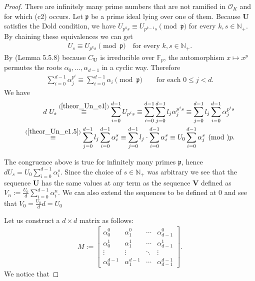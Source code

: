 \documentclass[preprint,12pt]{elsarticle}
\newcommand{\N}{\mathbb{N}}
\newcommand{\F}{\mathbb{F}}
\newcommand{\OO}{\mathcal{O}}
\newcommand{\alphas}{\alpha_0,\ldots,\alpha_{d-1}}
\newcommand{\pp}{\mathfrak{p} }
\begin{document}
\begin{proof}

    There are infinitely many prime numbers that are not ramified in $\OO_K$ and for which (c2) occurs. Let  $\pp$  be a prime ideal lying over one of them.
    Because ${\mathbf U}$ satisfies the Dold condition, we have $ U_{p^ks} \equiv  U_{p^{k-1}s} \pmod \pp$ for every $k,s\in\N_+$. By chaining these equivalences we can get
    \begin{align}\label{theor_Un_e1}
         U_{s} \equiv  U_{p^{k}s} \pmod \pp \quad\text{for every $k,s\in\N_+$}.
    \end{align}
    By \cite{frob} (Lemma 5.5.8) because $C_\mathbf{U}$ is irreducible over $\F_p$, the automorphism $x \mapsto x^p$ permutes the roots $\alphas$ in a cyclic way. Therefore 
    \begin{align}\label{theor_Un_e1.5}
        \sum_{i=0}^{d-1}\alpha_j^{p^i} \equiv \sum_{i=0}^{d-1}\alpha_i \pmod \pp 
        \quad\quad\text{for each $0\leqslant j<d$}.
    \end{align}
    We have
    \begin{equation}
      \begin{split}
        d\ U_s \overset{(\ref{theor_Un_e1})}{\equiv}
        \sum_{i=0}^{d-1}U_{p^is} \equiv
        \sum_{i=0}^{d-1}  \sum_{j=0}^{d-1} l_j\alpha_{j}^{p^is} \equiv
        \sum_{j=0}^{d-1} l_j\sum_{i=0}^{d-1}  \alpha_{j}^{p^is} 
        \\ \overset{(\ref{theor_Un_e1.5})}{\equiv}
        \sum_{j=0}^{d-1} l_j\sum_{i=0}^{d-1}  \alpha_{i}^s \equiv 
        \sum_{j=0}^{d-1} l_j \cdot \sum_{i=0}^{d-1}  \alpha_{i}^s \equiv
        U_0\sum_{i=0}^{d-1}  \alpha_{j}^s \pmod \pp.
    \end{split}  
    \end{equation}
    

    The congruence above is true for infinitely many primes $\pp$, hence $d U_s= U_0\sum_{i=0}^{d-1} \alpha_{i}^s$. Since the choice of $s\in\N_+$ was arbitrary we see that the sequence ${\mathbf U}$ has the same values at any term as the sequence ${\mathbf V}$ defined as $V_n := \frac{ U_0}{d}\sum_{i=0}^{d-1} \alpha_{i}^n$. We can also extend the sequences to be defined at 0 and see that ${V}_0 = \frac{ U_0}{d}d = U_0$

     
    Let us construct a $d\times d$ matrix as follows:
    \begin{align}
        M := \begin{bmatrix}
            \alpha_0^{0} & \alpha_1^{0} & \cdots & \alpha_{d-1}^{0}\\
            \alpha_0^{1} & \alpha_1^{1} & \cdots & \alpha_{d-1}^{1}\\
            \vdots & \vdots & \ddots & \vdots \\
            \alpha_0^{d-1} & \alpha_1^{d-1} & \cdots & \alpha_{d-1}^{d-1}
            \end{bmatrix}.
    \end{align}
    We notice that
    

\end{proof}
\end{document}
